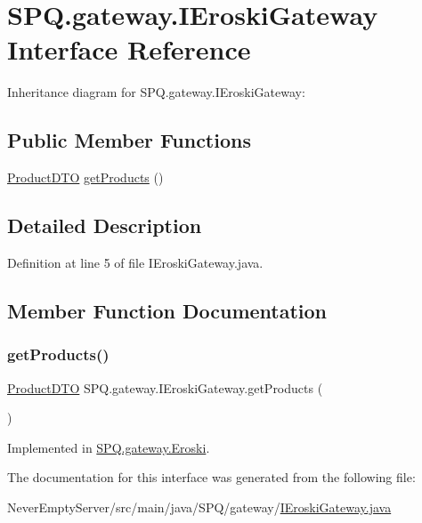 \hypertarget{interface_s_p_q_1_1gateway_1_1_i_eroski_gateway}{}\section{S\+P\+Q.\+gateway.\+I\+Eroski\+Gateway Interface Reference}
\label{interface_s_p_q_1_1gateway_1_1_i_eroski_gateway}


Inheritance diagram for S\+P\+Q.\+gateway.\+I\+Eroski\+Gateway\+:
\subsection*{Public Member Functions}
\begin{DoxyCompactItemize}
\item 
\mbox{\hyperlink{class_s_p_q_1_1dto_1_1_product_d_t_o}{Product\+D\+TO}} \mbox{\hyperlink{interface_s_p_q_1_1gateway_1_1_i_eroski_gateway_a6263f66378bc39296c6ea003642d79b9}{get\+Products}} ()
\end{DoxyCompactItemize}


\subsection{Detailed Description}


Definition at line 5 of file I\+Eroski\+Gateway.\+java.



\subsection{Member Function Documentation}
\mbox{\label{interface_s_p_q_1_1gateway_1_1_i_eroski_gateway_a6263f66378bc39296c6ea003642d79b9}} 
\subsubsection{\texorpdfstring{get\+Products()}{getProducts()}}
{\footnotesize\ttfamily \mbox{\hyperlink{class_s_p_q_1_1dto_1_1_product_d_t_o}{Product\+D\+TO}} S\+P\+Q.\+gateway.\+I\+Eroski\+Gateway.\+get\+Products (\begin{DoxyParamCaption}{ }\end{DoxyParamCaption})}



Implemented in \mbox{\hyperlink{class_s_p_q_1_1gateway_1_1_eroski_acfd174565206c16fb55489786957b8de}{S\+P\+Q.\+gateway.\+Eroski}}.



The documentation for this interface was generated from the following file\+:\begin{DoxyCompactItemize}
\item 
Never\+Empty\+Server/src/main/java/\+S\+P\+Q/gateway/\mbox{\hyperlink{_i_eroski_gateway_8java}{I\+Eroski\+Gateway.\+java}}\end{DoxyCompactItemize}
